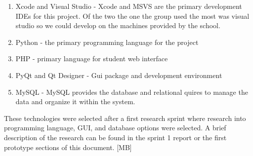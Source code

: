 \begin{enumerate}
\item Xcode and Visual Studio - Xcode and MSVS are the primary development IDEs for this project. Of the two the one the group used the most was visual studio so we could develop on the machines provided by the school.
\item Python - the primary programming language for the project
\item PHP - primary language for student web interface
\item PyQt and Qt Designer - Gui package and development environment 
\item MySQL - MySQL provides the database and relational quires to manage the data and organize it within the system.
\end{enumerate}


\textmd{These technologies were selected after a first research sprint where research into programming language, GUI, and database options were selected. A brief description of the research can be found in the sprint 1 report or the first prototype sections of this document. [MB]}

